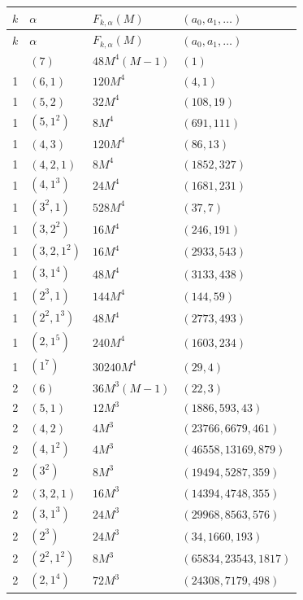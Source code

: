 \documentclass[11pt,a4paper]{article}
\theoremstyle{remark}
\begin{document}
\begingroup
\setlength{\tabcolsep}{4pt}
\renewcommand{\arraystretch}{1.13}
\footnotesize
\begin{longtable}{@{}rlll@{}}
\toprule
$k$ & $\alpha$ & $F_{k,\alpha}(M)$ & $(a_0,a_1,\ldots)$\\
\midrule
\endfirsthead
\toprule
$k$ & $\alpha$ & $F_{k,\alpha}(M)$ & $(a_0,a_1,\ldots)$\\
\midrule
\endhead
\bottomrule
\endfoot
1 & $(7)$ & $48 M^{4} \left(M - 1\right)$ & $(1)$\\
1 & $(6,1)$ & $120 M^{4}$ & $(4,1)$\\
1 & $(5,2)$ & $32 M^{4}$ & $(108,19)$\\
1 & $(5,1^{2})$ & $8 M^{4}$ & $(691,111)$\\
1 & $(4,3)$ & $120 M^{4}$ & $(86,13)$\\
1 & $(4,2,1)$ & $8 M^{4}$ & $(1852,327)$\\
1 & $(4,1^{3})$ & $24 M^{4}$ & $(1681,231)$\\
1 & $(3^{2},1)$ & $528 M^{4}$ & $(37,7)$\\
1 & $(3,2^{2})$ & $16 M^{4}$ & $(246,191)$\\
1 & $(3,2,1^{2})$ & $16 M^{4}$ & $(2933,543)$\\
1 & $(3,1^{4})$ & $48 M^{4}$ & $(3133,438)$\\
1 & $(2^{3},1)$ & $144 M^{4}$ & $(144,59)$\\
1 & $(2^{2},1^{3})$ & $48 M^{4}$ & $(2773,493)$\\
1 & $(2,1^{5})$ & $240 M^{4}$ & $(1603,234)$\\
1 & $(1^{7})$ & $30240 M^{4}$ & $(29,4)$\\
2 & $(6)$ & $36 M^{3} \left(M - 1\right)$ & $(22,3)$\\
2 & $(5,1)$ & $12 M^{3}$ & $(1886,593,43)$\\
2 & $(4,2)$ & $4 M^{3}$ & $(23766,6679,461)$\\
2 & $(4,1^{2})$ & $4 M^{3}$ & $(46558,13169,879)$\\
2 & $(3^{2})$ & $8 M^{3}$ & $(19494,5287,359)$\\
2 & $(3,2,1)$ & $16 M^{3}$ & $(14394,4748,355)$\\
2 & $(3,1^{3})$ & $24 M^{3}$ & $(29968,8563,576)$\\
2 & $(2^{3})$ & $24 M^{3}$ & $(34,1660,193)$\\
2 & $(2^{2},1^{2})$ & $8 M^{3}$ & $(65834,23543,1817)$\\
2 & $(2,1^{4})$ & $72 M^{3}$ & $(24308,7179,498)$\\

\end{longtable}
\end{document}
